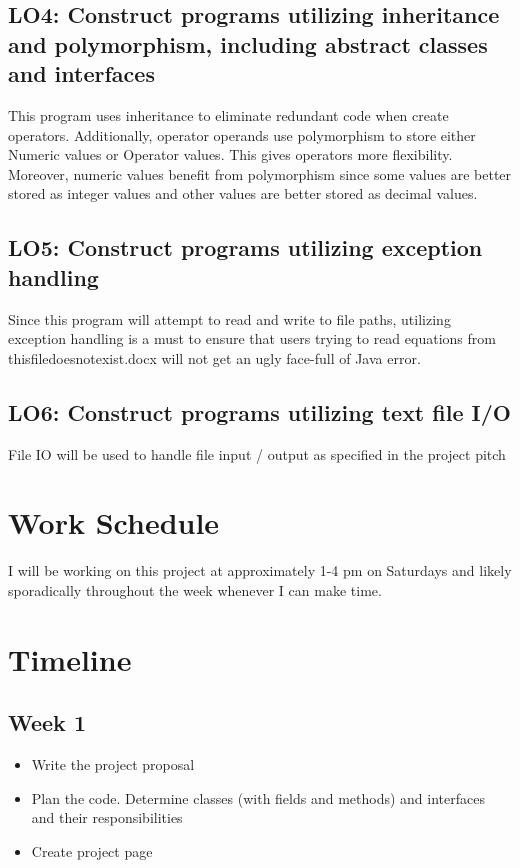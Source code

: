\documentclass{article}
\begin{document}
\subsection{LO4: Construct programs utilizing inheritance and polymorphism, including abstract classes and interfaces}
This program uses inheritance to eliminate redundant code when create operators. Additionally, operator operands use polymorphism to store either Numeric values or Operator values. This gives operators more flexibility. Moreover, numeric values benefit from polymorphism since some values are better stored as integer values and other values are better stored as decimal values.
\subsection{LO5: Construct programs utilizing exception handling}
Since this program will attempt to read and write to file paths, utilizing exception handling is a must to ensure that users trying to read equations from thisfiledoesnotexist.docx will not get an ugly face-full of Java error.
\subsection{LO6: Construct programs utilizing text file I/O}
File IO will be used to handle file input / output as specified in the project pitch

\section{Work Schedule}
I will be working on this project at approximately 1-4 pm on Saturdays and likely sporadically throughout the week whenever I can make time.
\section{Timeline}
\subsection{Week 1}
\begin{itemize}
	\item Write the project proposal
	\item Plan the code. Determine classes (with fields and methods) and interfaces and their responsibilities
	\item Create project page
\end{itemize}
\end{document}
